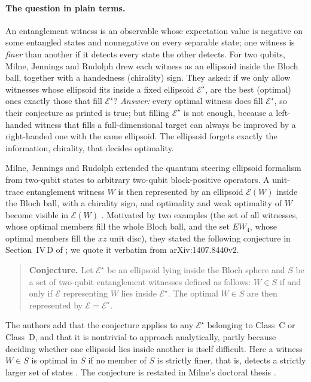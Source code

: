 \documentclass[11pt,a4paper]{article}
\theoremstyle{definition}\newtheorem{definition}[theorem]{Definition}
\newcommand{\E}{\mathcal E}
\theoremstyle{plain}\newtheorem*{theorem*}{Theorem}
\begin{document}
\paragraph{The question in plain terms.} An entanglement witness is an observable whose expectation value is negative on some entangled states and nonnegative on every separable state; one witness is \emph{finer} than another if it detects every state the other detects. For two qubits, Milne, Jennings and Rudolph drew each witness as an ellipsoid inside the Bloch ball, together with a handedness (chirality) sign. They asked: if we only allow witnesses whose ellipsoid fits inside a fixed ellipsoid $\E^\star$, are the best (optimal) ones exactly those that fill $\E^\star$? \emph{Answer:} every optimal witness does fill $\E^\star$, so their conjecture as printed is true; but filling $\E^\star$ is not enough, because a left-handed witness that fills a full-dimensional target can always be improved by a right-handed one with the same ellipsoid. The ellipsoid forgets exactly the information, chirality, that decides optimality.

Milne, Jennings and Rudolph \cite{milne} extended the quantum steering ellipsoid formalism from two-qubit states to arbitrary two-qubit block-positive operators. A unit-trace entanglement witness $W$ is then represented by an ellipsoid $\E(W)$ inside the Bloch ball, with a chirality sign, and optimality and weak optimality of $W$ become visible in $\E(W)$ \cite[Theorem~4]{milne}. Motivated by two examples (the set of all witnesses, whose optimal members fill the whole Bloch ball, and the set $EW_4$, whose optimal members fill the $xz$ unit disc), they stated the following conjecture in Section~IV\,D of \cite{milne}; we quote it verbatim from arXiv:1407.8440v2.

\begin{quote}
\textbf{Conjecture.} Let $\E^\star$ be an ellipsoid lying inside the Bloch sphere and $S$ be a set of two-qubit entanglement witnesses defined as follows: $W\in S$ if and only if $\E$ representing $W$ lies inside $\E^\star$. The optimal $W\in S$ are then represented by $\E=\E^\star$.
\end{quote}

The authors add that the conjecture applies to any $\E^\star$ belonging to Class~C or Class~D, and that it is nontrivial to approach analytically, partly because deciding whether one ellipsoid lies inside another is itself difficult. Here a witness $W\in S$ is optimal in $S$ if no member of $S$ is strictly finer, that is, detects a strictly larger set of states \cite{milne,lewenstein}. The conjecture is restated in Milne's doctoral thesis \cite{thesis}.
\end{document}
